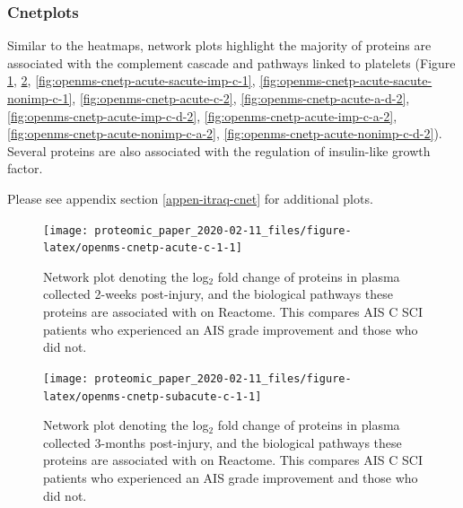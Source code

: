 \documentclass[
]{article}
\begin{document}
\hypertarget{cnetplot-chap3}{%
\subsubsection{Cnetplots}\label{cnetplot-chap3}}

Similar to the heatmaps, network plots highlight the majority of proteins are associated with the complement cascade and pathways linked to platelets (Figure \ref{fig:openms-cnetp-acute-c-1}, \ref{fig:openms-cnetp-subacute-c-1}, \ref{fig:openms-cnetp-acute-sacute-imp-c-1}, \ref{fig:openms-cnetp-acute-sacute-nonimp-c-1}, \ref{fig:openms-cnetp-acute-c-2}, \ref{fig:openms-cnetp-acute-a-d-2}, \ref{fig:openms-cnetp-acute-imp-c-d-2}, \ref{fig:openms-cnetp-acute-imp-c-a-2}, \ref{fig:openms-cnetp-acute-nonimp-c-a-2}, \ref{fig:openms-cnetp-acute-nonimp-c-d-2}).
Several proteins are also associated with the regulation of insulin-like growth factor.

Please see appendix section \ref{appen-itraq-cnet} for additional plots.

\begin{SidewaysFigure}



\begin{figure}

{\centering \texttt{[image: proteomic\_paper\_2020-02-11\_files/figure-latex/openms-cnetp-acute-c-1-1]} 

}

\caption{Network plot denoting the log$_2$ fold change of proteins in plasma collected 2-weeks post-injury, and the biological pathways these proteins are associated with on Reactome. This compares AIS C SCI patients who experienced an AIS grade improvement and those who did not.}\label{fig:openms-cnetp-acute-c-1}
\end{figure}

\end{SidewaysFigure}
\begin{SidewaysFigure}



\begin{figure}

{\centering \texttt{[image: proteomic\_paper\_2020-02-11\_files/figure-latex/openms-cnetp-subacute-c-1-1]} 

}

\caption{Network plot denoting the log$_2$ fold change of proteins in plasma collected 3-months post-injury, and the biological pathways these proteins are associated with on Reactome. This compares AIS C SCI patients who experienced an AIS grade improvement and those who did not.}\label{fig:openms-cnetp-subacute-c-1}
\end{figure}

\end{SidewaysFigure}
\end{document}
